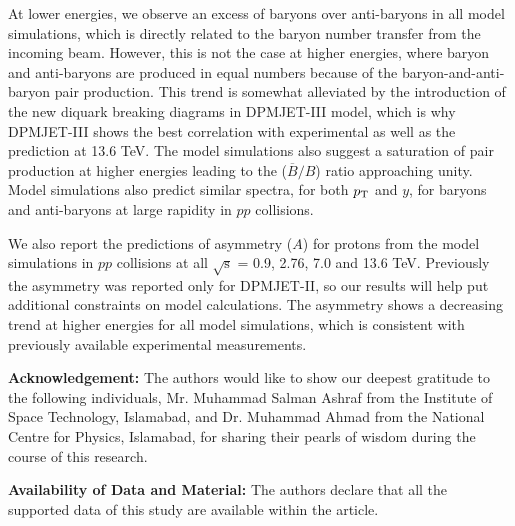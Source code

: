 \documentclass{article}
\newcommand{\sqrts}{\mbox{$\sqrt{\mathrm{s}}$}}
\newcommand{\ppt}{$p_{\rm T}$}
\begin{document}
At lower energies, we observe an excess of baryons over anti-baryons in all model simulations, which is directly related to the baryon number transfer from the incoming beam. However, this is not the case at higher energies, where baryon and anti-baryons are produced in equal numbers because of the baryon-and-anti-baryon pair production. This trend is somewhat alleviated by the introduction of the new diquark breaking diagrams in DPMJET-III model, which is why DPMJET-III shows the best correlation with experimental as well as the prediction at 13.6 TeV. The model simulations also suggest a saturation of pair production at higher energies leading to the ($\overline{B}/B$) ratio approaching unity. Model simulations also predict similar spectra, for both {\ppt} and $y$, for baryons and anti-baryons at large rapidity in $pp$ collisions. 

We also report the predictions of asymmetry ($A$) for protons from the model simulations in $pp$ collisions at all {\sqrts} = 0.9, 2.76, 7.0 and 13.6 TeV. Previously the asymmetry was reported only for DPMJET-II, so our results will help put additional constraints on model calculations. The asymmetry shows a decreasing trend at higher energies for all model simulations, which is consistent with previously available experimental measurements. 


\vskip0.5cm
\textbf{Acknowledgement:}
 The authors would like to show our deepest gratitude to the following individuals, Mr. Muhammad Salman Ashraf from the  Institute of Space Technology, Islamabad, and Dr. Muhammad Ahmad from the National Centre for Physics, Islamabad, for sharing their pearls of wisdom during the course of this research. 

\vskip0.5cm
\textbf{Availability of Data and Material:}
The authors declare that all the supported data of this study are available within the article.





\end{document}
